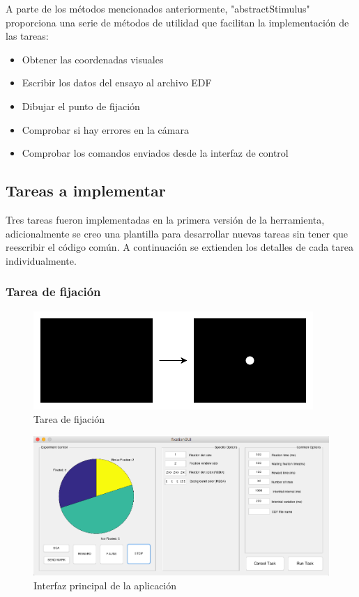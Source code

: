 \documentclass[conference]{IEEEtran}
\begin{document}
A parte de los métodos mencionados anteriormente, "abstractStimulus" proporciona una serie de métodos de utilidad que facilitan la implementación de las tareas:

\begin{itemize}
	\item Obtener las coordenadas visuales
	\item Escribir los datos del ensayo al archivo EDF
	\item Dibujar el punto de fijación
	\item Comprobar si hay errores en la cámara
	\item Comprobar los comandos enviados desde la interfaz de control
\end{itemize}


\subsection{Tareas a implementar}

Tres tareas fueron implementadas en la primera versión de la herramienta, adicionalmente se creo una plantilla para desarrollar nuevas tareas sin tener que reescribir el código común. A continuación se extienden los detalles de cada tarea individualmente.

\subsubsection*{Tarea de fijación}

\begin{figure}[htbp]
\centerline{\includegraphics[width=\linewidth]{figures/fixation}}
\caption{Tarea de fijación}
\label{figfixTask}
\end{figure}

\begin{figure}[htbp]
\centerline{\includegraphics[width=\linewidth]{figures/fixation_gui}}
\caption{Interfaz principal de la aplicación}
\label{figfixGUI}
\end{figure}
\end{document}
